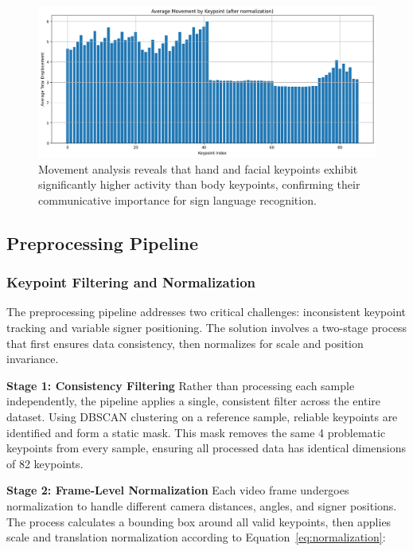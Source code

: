 \begin{figure}
    \centering
    \includegraphics[width=1\linewidth]{keypoint_analysis.png}
    \caption{Movement analysis reveals that hand and facial keypoints exhibit significantly higher activity than body keypoints, confirming their communicative importance for sign language recognition.}
    \label{fig:keypoint_movement_analysis}
\end{figure}

\subsection{Preprocessing Pipeline}

\subsubsection{Keypoint Filtering and Normalization}

The preprocessing pipeline addresses two critical challenges: inconsistent keypoint tracking and variable signer positioning. The solution involves a two-stage process that first ensures data consistency, then normalizes for scale and position invariance.

\textbf{Stage 1: Consistency Filtering}
Rather than processing each sample independently, the pipeline applies a single, consistent filter across the entire dataset. Using DBSCAN clustering \cite{deng2020dbscan} on a reference sample, reliable keypoints are identified and form a static mask. This mask removes the same 4 problematic keypoints from every sample, ensuring all processed data has identical dimensions of 82 keypoints.

\textbf{Stage 2: Frame-Level Normalization}
Each video frame undergoes normalization to handle different camera distances, angles, and signer positions. The process calculates a bounding box around all valid keypoints, then applies scale and translation normalization according to Equation~\ref{eq:normalization}:

